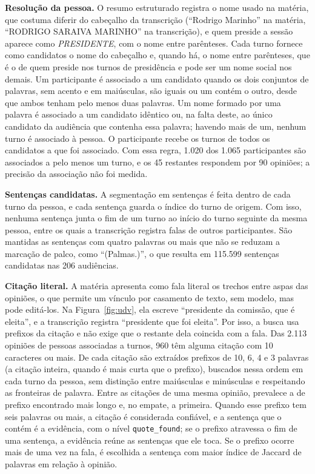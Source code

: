 \textbf{Resolução da pessoa.} O resumo estruturado registra o nome usado na matéria, que costuma
diferir do cabeçalho da transcrição (``Rodrigo Marinho'' na matéria, ``RODRIGO SARAIVA MARINHO'' na
transcrição), e quem preside a sessão aparece como \textit{PRESIDENTE}, com o nome entre parênteses.
Cada turno fornece como candidatos o nome do cabeçalho e, quando há, o nome entre parênteses, que é o
de quem preside nos turnos de presidência e pode ser um nome social nos demais. Um participante é
associado a um candidato quando os dois conjuntos de palavras, sem acento e em maiúsculas, são iguais
ou um contém o outro, desde que ambos tenham pelo menos duas palavras. Um nome formado por uma
palavra é associado a um candidato idêntico ou, na falta deste, ao único candidato da audiência que
contenha essa palavra; havendo mais de um, nenhum turno é associado à pessoa. O participante recebe
os turnos de todos os candidatos a que foi associado. Com essa regra, 1.020 dos 1.065 participantes
são associados a pelo menos um turno, e os 45 restantes respondem por 90 opiniões; a precisão da
associação não foi medida.



\textbf{Sentenças candidatas.} A segmentação em sentenças é feita dentro de cada turno da pessoa, e
cada sentença guarda o índice do turno de origem. Com isso, nenhuma sentença junta o fim de um turno
ao início do turno seguinte da mesma pessoa, entre os quais a transcrição registra falas de outros
participantes. São mantidas as sentenças com quatro palavras ou mais que não se reduzam a
marcação de palco, como ``(Palmas.)'', o que resulta em 115.599 sentenças candidatas nas 206
audiências.

\textbf{Citação literal.} A matéria apresenta como fala literal os trechos entre aspas das opiniões,
o que permite um vínculo por casamento de texto, sem modelo, mas pode editá-los. Na
Figura~\ref{fig:udv}, ela escreve ``presidente da comissão, que é eleita'', e a transcrição registra
``presidente que foi eleita''. Por isso, a busca usa prefixos da citação e não exige que o restante
dela coincida com a fala.
Das 2.113 opiniões de pessoas associadas a turnos, 960 têm alguma citação com 10 caracteres ou mais.
De cada citação são extraídos prefixos de 10, 6, 4 e 3 palavras (a citação inteira, quando é mais
curta que o prefixo), buscados nessa ordem em cada turno da pessoa, sem distinção entre maiúsculas e
minúsculas e respeitando as fronteiras de palavra. Entre as citações de uma mesma opinião, prevalece a
de prefixo encontrado mais longo e, no empate, a primeira. Quando esse prefixo tem seis palavras ou
mais, a citação é considerada confiável, e a sentença que o contém é a evidência, com o nível
\texttt{quote\_found}; se o prefixo atravessa o fim de uma sentença, a evidência reúne as sentenças
que ele toca. Se o prefixo ocorre mais de uma vez na fala, é escolhida a sentença com maior índice de
Jaccard de palavras em relação à opinião.

